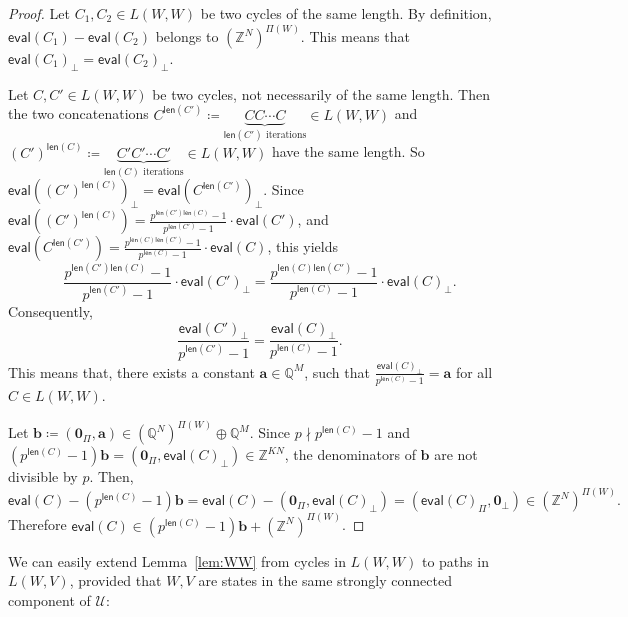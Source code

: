 \documentclass[letterpaper, 11pt, thm-restate]{article}
\numberwithin{equation}{section}
\newcommand{\Z}{\mathbb{Z}}
\newcommand{\Q}{\mathbb{Q}}
\newcommand{\ba}{\boldsymbol{a}}
\newcommand{\bb}{\boldsymbol{b}}
\newcommand{\mmU}{\mathscr{U}}
\newcommand{\bzer}{\boldsymbol{0}}
\newcommand{\len}{\mathsf{len}}
\newcommand{\eval}{\mathsf{eval}}
\theoremstyle{definition}
\theoremstyle{definition}
\theoremstyle{definition}
\begin{document}
\begin{proof}
    Let $C_1, C_2 \in L(W, W)$ be two cycles of the same length. 
    By definition, $\eval(C_1) - \eval(C_2)$ belongs to $(\Z^N)^{\Pi(W)}$.
    This means that $\eval(C_1)_{\perp} = \eval(C_2)_{\perp}$.

    Let $C, C' \in L(W, W)$ be two cycles, not necessarily of the same length.
    Then the two concatenations $C^{\len(C')} \coloneqq \underbrace{CC \cdots C}_{\text{$\len(C')$ iterations}} \in L(W, W)$ and $(C')^{\len(C)} \coloneqq \underbrace{C'C' \cdots C'}_{\text{$\len(C)$ iterations}} \in L(W, W)$ have the same length.
    So $\eval\left((C')^{\len(C)}\right)_{\perp} = \eval\left(C^{\len(C')}\right)_{\perp}$.
    Since $\eval\left((C')^{\len(C)}\right) = \frac{p^{\len(C')\len(C)} - 1}{p^{\len(C')} - 1} \cdot \eval(C')$, and $\eval\left(C^{\len(C')}\right) = \frac{p^{\len(C)\len(C')} - 1}{p^{\len(C)} - 1} \cdot \eval(C)$, this yields
    \[
    \frac{p^{\len(C')\len(C)} - 1}{p^{\len(C')} - 1} \cdot \eval(C')_\perp = \frac{p^{\len(C)\len(C')} - 1}{p^{\len(C)} - 1} \cdot \eval(C)_\perp.
    \]
    Consequently,
    \[
    \frac{\eval(C')_\perp}{p^{\len(C')} - 1} = \frac{\eval(C)_\perp}{p^{\len(C)} - 1}.
    \]
    This means that, there exists a constant $\ba \in \Q^{M}$, such that $\frac{\eval(C)_\perp}{p^{\len(C)} - 1} = \ba$ for all $C \in L(W, W)$.

    Let $\bb \coloneqq (\bzer_{\Pi}, \ba) \in (\Q^N)^{\Pi(W)} \oplus \Q^M$.
    Since $p \nmid p^{\len(C)} - 1$ and $(p^{\len(C)} - 1) \bb = (\bzer_{\Pi}, \eval(C)_\perp) \in\Z^{KN}$, the denominators of $\bb$ are not divisible by $p$.
    Then,
    \[
    \eval(C) - \left(p^{\len(C)} - 1\right) \bb = \eval(C) - (\bzer_{\Pi}, \eval(C)_\perp) = \left(\eval(C)_{\Pi}, \bzer_{\perp}\right) \in (\Z^N)^{\Pi(W)}.
    \]    
    Therefore $\eval(C) \in \left(p^{\len(C)} - 1\right) \bb + (\Z^N)^{\Pi(W)}$.
\end{proof}

We can easily extend Lemma~\ref{lem:WW} from cycles in $L(W, W)$ to paths in $L(W, V)$, provided that $W, V$ are states in the same strongly connected component of $\mmU$:
\end{document}
